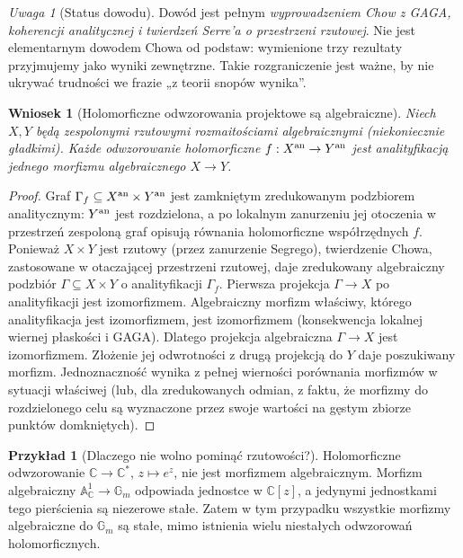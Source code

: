 \documentclass[11pt,a4paper,openany]{report}
\numberwithin{equation}{section}
\theoremstyle{plain}
\newtheorem{wniosek}[twierdzenie]{Wniosek}
\theoremstyle{definition}
\newtheorem{przyklad}[twierdzenie]{Przykład}
\theoremstyle{remark}
\newtheorem{uwaga}[twierdzenie]{Uwaga}
\newcommand{\C}{\mathbb C}
\newcommand{\A}{\mathbb A}
\begin{document}
\begin{uwaga}[Status dowodu]
Dowód jest pełnym \emph{wyprowadzeniem Chow z GAGA,
koherencji analitycznej i twierdzeń Serre'a o przestrzeni
rzutowej}. Nie jest elementarnym dowodem Chowa od podstaw:
wymienione trzy rezultaty przyjmujemy jako wyniki zewnętrzne.
Takie rozgraniczenie jest ważne, by nie ukrywać trudności
we frazie „z teorii snopów wynika”.
\end{uwaga}

\begin{wniosek}[Holomorficzne odwzorowania projektowe są algebraiczne]
\label{wn:ga9-hol-map}
Niech $X,Y$ będą zespolonymi rzutowymi rozmaitościami
algebraicznymi (niekoniecznie gładkimi). Każde
odwzorowanie holomorficzne
$f:X^{\rm an}\to Y^{\rm an}$ jest analityfikacją
jednego morfizmu algebraicznego $X\to Y$.
\end{wniosek}
\begin{proof}
Graf $\Gamma_f\subseteq X^{\rm an}\times Y^{\rm an}$
jest zamkniętym zredukowanym podzbiorem analitycznym:
$Y^{\rm an}$ jest rozdzielona, a po lokalnym zanurzeniu
jej otoczenia w przestrzeń zespoloną graf opisują
równania holomorficzne współrzędnych $f$.
Ponieważ $X\times Y$ jest rzutowy (przez zanurzenie Segrego),
twierdzenie Chowa, zastosowane w otaczającej przestrzeni
rzutowej, daje zredukowany algebraiczny podzbiór
$\Gamma\subseteq X\times Y$ o analityfikacji $\Gamma_f$.
Pierwsza projekcja $\Gamma\to X$ po analityfikacji
jest izomorfizmem.
Algebraiczny morfizm właściwy, którego analityfikacja
jest izomorfizmem, jest izomorfizmem (konsekwencja
lokalnej wiernej płaskości i GAGA). Dlatego
projekcja algebraiczna $\Gamma\to X$ jest
izomorfizmem. Złożenie jej odwrotności z drugą
projekcją do $Y$ daje poszukiwany morfizm.
Jednoznaczność wynika z pełnej wierności porównania morfizmów
w sytuacji właściwej (lub, dla zredukowanych odmian, z faktu,
że morfizmy do rozdzielonego celu są wyznaczone przez swoje
wartości na gęstym zbiorze punktów domkniętych).
\end{proof}

\begin{przyklad}[Dlaczego nie wolno pominąć rzutowości?]
Holomorficzne odwzorowanie $\C\to\C^*$, $z\mapsto e^z$,
nie jest morfizmem algebraicznym. Morfizm algebraiczny
$\A^1_\C\to\mathbb G_m$ odpowiada jednostce w $\C[z]$,
a jedynymi jednostkami tego pierścienia są niezerowe
stałe. Zatem w tym przypadku wszystkie morfizmy
algebraiczne do $\mathbb G_m$ są stałe, mimo istnienia wielu
niestałych odwzorowań holomorficznych.
\end{przyklad}
\end{document}
